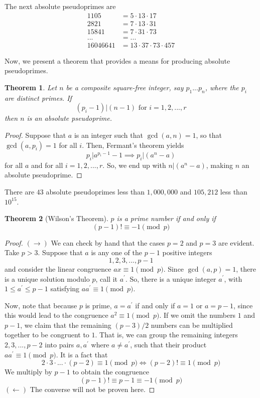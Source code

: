 \documentclass{article}
\newtheorem{theorem}{Theorem}[section]
\theoremstyle{remark}
\theoremstyle{definition}
\begin{document}
The next absolute pseudoprimes are 
\begin{align*}
    1105 & = 5 \cdot 13 \cdot 17 \\
    2821 & = 7 \cdot 13 \cdot 31 \\
    15841 & = 7 \cdot 31 \cdot 73 \\
    ... & = ... \\
    16046641 & = 13 \cdot 37 \cdot 73 \cdot 457
\end{align*}

Now, we present a theorem that provides a means for producing absolute pseudoprimes. 

\begin{theorem}
Let $n$ be a composite square-free integer, say $p_1... p_n$, where the $p_i$ are distinct primes. If 
\[(p_i - 1) \big| (n-1) \text{ for } i = 1, 2, ..., r\]
then $n$ is an absolute pseudoprime. 
\end{theorem}
\begin{proof}
Suppose that $a$ is an integer such that $\gcd(a, n) = 1$, so that $\gcd(a, p_i) = 1$ for all $i$. Then, Fermant's theorem yields
\[p_i \big| a^{p_i - 1} - 1 \implies p_i \big| (a^n - a)\]
for all $a$ and for all $i = 1, 2, ..., r$. So, we end up with $n \big| (a^n - a)$, making $n$ an absolute pseudoprime. 
\end{proof}

There are $43$ absolute pseudoprimes less than $1,000,000$ and $105,212$ less than $10^{15}$. 

\begin{theorem}[Wilson's Theorem]
$p$ is a prime number if and only if 
\[(p-1)! \equiv -1 \pmod{p}\]
\end{theorem}
\begin{proof}
$(\rightarrow)$ We can check by hand that the cases $p=2$ and $p=3$ are evident. Take $p >3$. Suppose that $a$ is any one of the $p-1$ positive integers
\[1, 2, 3, ..., p-1\]
and consider the linear congruence $ax \equiv 1 \pmod{p}$. Since $\gcd(a, p) = 1$, there is a unique solution modulo $p$, call it $a^\prime$. So, there is a unique integer $a^\prime$, with $1 \leq a^\prime \leq p-1$ satisfying $a a^\prime \equiv 1 \pmod{p}$. 

Now, note that because $p$ is prime, $a = a^\prime$ if and only if $a = 1$ or $a = p-1$, since this would lead to the congruence $a^2 \equiv 1 \pmod{p}$. If we omit the numbers $1$ and $p-1$, we claim that the remaining $(p-3)/2$ numbers can be multiplied together to be congruent to $1$. That is, we can group the remaining integers $2, 3, ..., p-2$ into pairs $a, a^\prime$ where $a \neq a^\prime$, such that their product $a a^\prime \equiv 1 \pmod{p}$. It is a fact that 
\[2 \cdot 3 \cdot ... \cdot (p-2) \equiv 1 \pmod{p} \iff (p-2)! \equiv 1 \pmod{p}\]
We multiply by $p-1$ to obtain the congruence
\[(p-1)! \equiv p-1 \equiv -1 \pmod{p}\]
$(\leftarrow)$ The converse will not be proven here. 
\end{proof}
\end{document}
